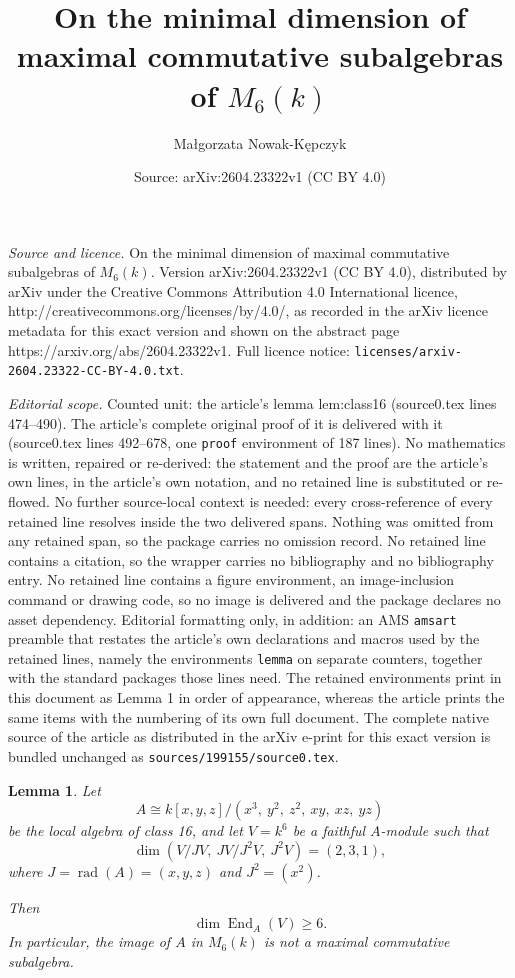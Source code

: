 \documentclass[10pt,a4paper]{amsart}
\title{On the minimal dimension of maximal commutative subalgebras of $M_6(k)$}
\author{Małgorzata Nowak-Kępczyk}
\date{Source: arXiv:2604.23322v1 (CC BY 4.0)}
\newtheorem{lemma}{Lemma}
\DeclareMathOperator{\End}{End}
\DeclareMathOperator{\rad}{rad}
\begin{document}
\maketitle

\noindent\emph{Source and licence.} On the minimal dimension of maximal commutative subalgebras of $M_6(k)$. Version arXiv:2604.23322v1 (CC BY 4.0), distributed by arXiv under the Creative Commons Attribution 4.0 International licence, http://creativecommons.org/licenses/by/4.0/, as recorded in the arXiv licence metadata for this exact version and shown on the abstract page https://arxiv.org/abs/2604.23322v1. Full licence notice: \texttt{licenses/arxiv-2604.23322-CC-BY-4.0.txt}.\par\smallskip

\noindent\textit{Editorial scope.} Counted unit: the article's lemma lem:class16 (source0.tex lines 474--490). The article's complete original proof of it is delivered with it (source0.tex lines 492--678, one \texttt{proof} environment of 187 lines). No mathematics is written, repaired or re-derived: the statement and the proof are the article's own lines, in the article's own notation, and no retained line is substituted or re-flowed.  No further source-local context is needed: every cross-reference of every retained line resolves inside the two delivered spans.  Nothing was omitted from any retained span, so the package carries no omission record.  No retained line contains a citation, so the wrapper carries no bibliography and no bibliography entry.  No retained line contains a figure environment, an image-inclusion command or drawing code, so no image is delivered and the package declares no asset dependency.  Editorial formatting only, in addition: an AMS \texttt{amsart} preamble that restates the article's own declarations and macros used by the retained lines, namely the environments \texttt{lemma} on separate counters, together with the standard packages those lines need.  The retained environments print in this document as Lemma 1 in order of appearance, whereas the article prints the same items with the numbering of its own full document.  The complete native source of the article as distributed in the arXiv e-print for this exact version is bundled unchanged as \texttt{sources/199155/source0.tex}.
\begin{lemma}\label{lem:class16}
	Let
	\[
	A \cong k[x,y,z]/(x^3,\ y^2,\ z^2,\ xy,\ xz,\ yz)
	\]
	be the local algebra of class {\rm 16}, and let $V=k^6$ be a faithful $A$-module such that
	\[
	\dim(V/JV,\ JV/J^2V,\ J^2V)=(2,3,1),
	\]
	where $J=\rad(A)=(x,y,z)$ and $J^2=(x^2)$.
	
	Then
	\[
	\dim \End_A(V)\ge 6.
	\]
	In particular, the image of $A$ in $M_6(k)$ is not a maximal commutative subalgebra.
\end{lemma}
\end{document}
